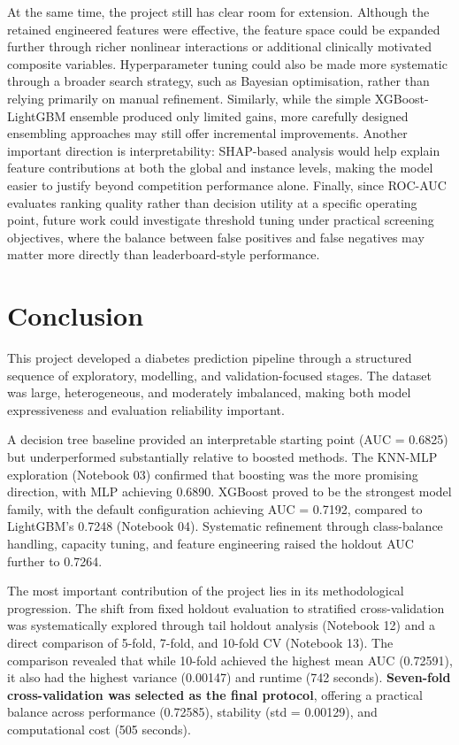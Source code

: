 \documentclass[a4paper,11pt]{article}
\begin{document}
At the same time, the project still has clear room for extension. Although the retained engineered features were effective, the feature space could be expanded further through richer nonlinear interactions or additional clinically motivated composite variables. Hyperparameter tuning could also be made more systematic through a broader search strategy, such as Bayesian optimisation, rather than relying primarily on manual refinement. Similarly, while the simple XGBoost-LightGBM ensemble produced only limited gains, more carefully designed ensembling approaches may still offer incremental improvements. Another important direction is interpretability: SHAP-based analysis would help explain feature contributions at both the global and instance levels, making the model easier to justify beyond competition performance alone. Finally, since ROC-AUC evaluates ranking quality rather than decision utility at a specific operating point, future work could investigate threshold tuning under practical screening objectives, where the balance between false positives and false negatives may matter more directly than leaderboard-style performance.

\section{Conclusion}

This project developed a diabetes prediction pipeline through a structured sequence of exploratory, modelling, and validation-focused stages. The dataset was large, heterogeneous, and moderately imbalanced, making both model expressiveness and evaluation reliability important.

A decision tree baseline provided an interpretable starting point (AUC = 0.6825) but underperformed substantially relative to boosted methods. The KNN-MLP exploration (Notebook 03) confirmed that boosting was the more promising direction, with MLP achieving 0.6890. XGBoost proved to be the strongest model family, with the default configuration achieving AUC = 0.7192, compared to LightGBM's 0.7248 (Notebook 04). Systematic refinement through class-balance handling, capacity tuning, and feature engineering raised the holdout AUC further to 0.7264.

The most important contribution of the project lies in its methodological progression. The shift from fixed holdout evaluation to stratified cross-validation was systematically explored through tail holdout analysis (Notebook 12) and a direct comparison of 5-fold, 7-fold, and 10-fold CV (Notebook 13). The comparison revealed that while 10-fold achieved the highest mean AUC (0.72591), it also had the highest variance (0.00147) and runtime (742 seconds). \textbf{Seven-fold cross-validation was selected as the final protocol}, offering a practical balance across performance (0.72585), stability (std = 0.00129), and computational cost (505 seconds).
\end{document}
